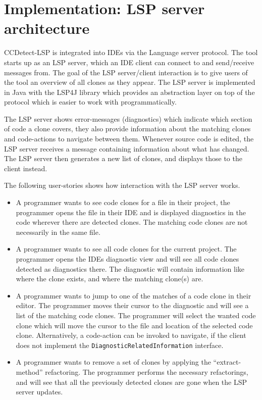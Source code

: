 \chapter{Implementation: LSP server architecture}
\label{lspimplementation}

CCDetect-LSP is integrated into IDEs via the Language server protocol. The tool starts up as
an LSP server, which an IDE client can connect to and send/receive messages from. The goal
of the LSP server/client interaction is to give users of the tool an overview of all
clones as they appear. The LSP server is implemented in Java with the LSP4J library which
provides an abstraction layer on top of the protocol which is easier to work with
programmatically.

The LSP server shows error-messages (diagnostics) which indicate which section of code a
clone covers, they also provide information about the matching clones and code-actions to
navigate between them. Whenever source code is edited, the LSP server receives a message
containing information about what has changed. The LSP server then generates a new list of
clones, and displays those to the client instead.

The following user-stories shows how interaction with the LSP server works.

\begin{itemize}
	\item A programmer wants to see code clones for a file in their project, the
	      programmer opens the file in their IDE and is displayed diagnostics in the code
	      wherever there are detected clones. The matching code clones are not necessarily
	      in the same file.

	\item A programmer wants to see all code clones for the current project. The
	      programmer opens the IDEs diagnostic view and will see all code clones detected
	      as diagnostics there. The diagnostic will contain information like where the clone
	      exists, and where the matching clone(s) are.

	\item A programmer wants to jump to one of the matches of a code clone in their
	      editor. The programmer moves their cursor to the diagnostic and will see a list of
	      the matching code clones. The programmer will select the wanted code clone which
	      will move the cursor to the file and location of the selected code clone.
          Alternatively, a code-action can be invoked to navigate, if the client does not
          implement the \verb|DiagnosticRelatedInformation| interface.

      \item A programmer wants to remove a set of clones by applying the
          ``extract-method'' refactoring. The programmer performs the necessary
          refactorings, and will see that all the previously detected clones are gone when
          the LSP server updates.

\end{itemize}

